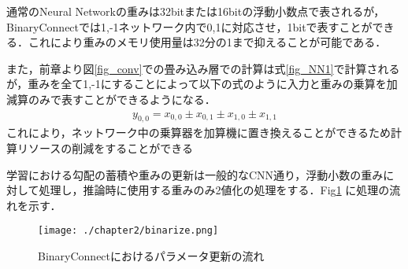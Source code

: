 通常のNeural Networkの重みは32bitまたは16bitの浮動小数点で表されるが，BinaryConnectでは1,-1ネットワーク内で0,1に対応させ，1bitで表すことができる．これにより重みのメモリ使用量は32分の1まで抑えることが可能である．

また，前章より図\ref{fig_conv}での畳み込み層での計算は式\ref{fig_NN1}で計算されるが，重みを全て1,-1にすることによって以下の式のように入力と重みの乗算を加減算のみで表すことができるようになる．
\begin{align}
  y_{0,0} = x_{0,0} \pm x_{0,1} \pm x_{1,0} \pm x_{1,1}
\end{align}
これにより，ネットワーク中の乗算器を加算機に置き換えることができるため計算リソースの削減をすることができる

学習における勾配の蓄積や重みの更新は一般的なCNN通り，浮動小数の重みに対して処理し，推論時に使用する重みのみ2値化の処理をする．Fig\ref{fig_binarize} に処理の流れを示す．
\begin{figure}[htbp]
  \begin{center}
    \texttt{[image: ./chapter2/binarize.png]}
    \caption{BinaryConnectにおけるパラメータ更新の流れ}
    \label{fig_binarize}
  \end{center}
\end{figure}